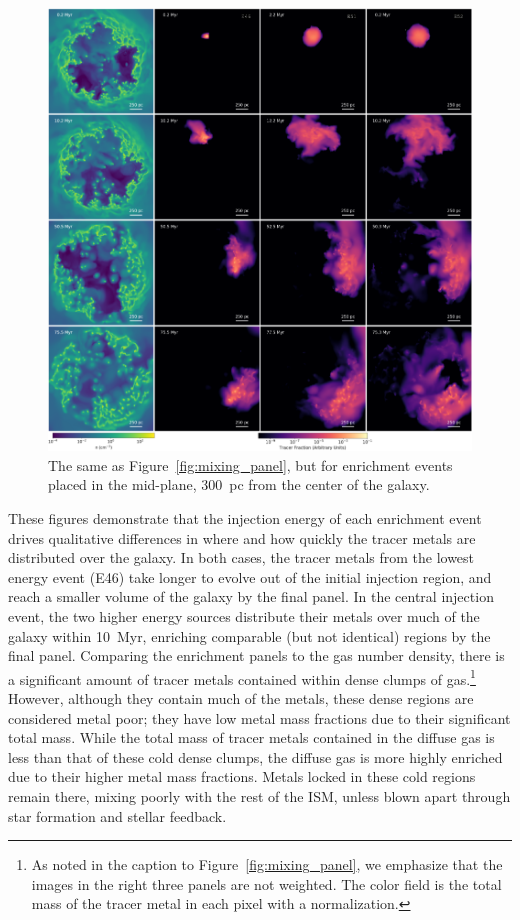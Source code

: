 \documentclass[twocolumn]{aastex62}
\begin{document}
\begin{figure}
\centering
\includegraphics[width=0.9\linewidth]{mixing_test_offcenter.png}
\caption{The same as Figure~\ref{fig:mixing_panel}, but for enrichment events placed in the mid-plane, 300~pc from the center of the galaxy.}
\label{fig:mixing_panel2}
\end{figure}

These figures demonstrate that the injection energy of each enrichment event drives qualitative differences in where and how quickly the tracer metals are distributed over the galaxy. In both cases, the tracer metals from the lowest energy event (E46) take longer to evolve out of the initial injection region, and reach a smaller volume of the galaxy by the final panel. In the central injection event, the two higher energy sources distribute their metals over much of the galaxy within 10~Myr, enriching comparable (but not identical) regions by the final panel. Comparing the enrichment panels to the gas number density, there is a significant amount of tracer metals contained within dense clumps of gas.\footnote{As noted in the caption to Figure~\ref{fig:mixing_panel}, we emphasize that the images in the right three panels are not weighted. The color field is the total mass of the tracer metal in each pixel with a normalization.} However, although they contain much of the metals, these dense regions are considered metal poor; they have low metal mass fractions due to their significant total mass. While the total mass of tracer metals contained in the diffuse gas is less than that of these cold dense clumps, the diffuse gas is more highly enriched due to their higher metal mass fractions. Metals locked in these cold regions remain there, mixing poorly with the rest of the ISM, unless blown apart through star formation and stellar feedback. %
\end{document}
